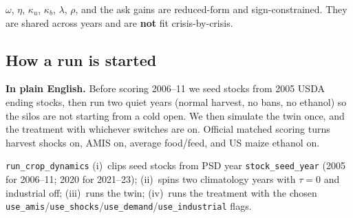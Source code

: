 $\omega$, $\eta$, $\kappa_u$, $\kappa_b$, $\lambda$, $\rho$, and the ask
gains are reduced-form and sign-constrained. They are shared across years
and are \textbf{not} fit crisis-by-crisis.

\subsection{How a run is started}
\label{sec:orch}

\textbf{In plain English.} Before scoring 2006--11 we seed stocks from 2005
USDA ending stocks, then run two quiet years (normal harvest, no bans, no
ethanol) so the silos are not starting from a cold open. We then simulate
the twin once, and the treatment with whichever switches are on. Official
matched scoring turns harvest shocks on, AMIS on, average food/feed, and US
maize ethanol on.

\texttt{run\_crop\_dynamics} (i)~clips seed stocks from PSD year
\texttt{stock\_seed\_year} (2005 for 2006--11; 2020 for 2021--23);
(ii)~spins two climatology years with $\tau=0$ and industrial off;
(iii)~runs the twin; (iv)~runs the treatment with the chosen
\texttt{use\_amis}/\texttt{use\_shocks}/\texttt{use\_demand}/\texttt{use\_industrial}
flags.
